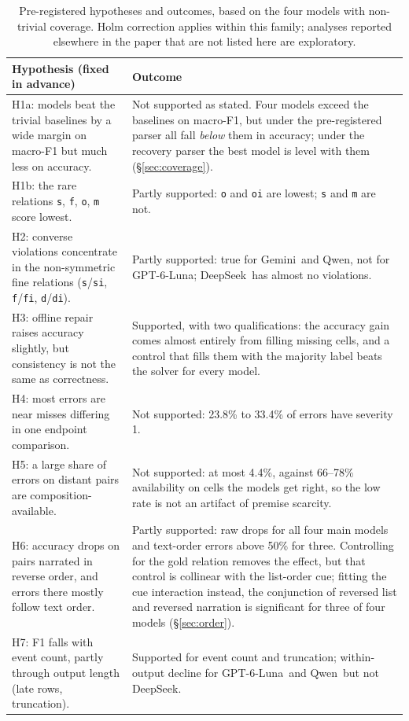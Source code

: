 \documentclass[11pt]{article}
\newcommand{\rel}[1]{\texttt{#1}}
\newcommand{\Ds}{DeepSeek}
\newcommand{\Gp}{GPT-6-Luna}
\newcommand{\Gm}{Gemini}
\newcommand{\Qw}{Qwen}
\begin{document}
\begin{table}[t]
\centering
\small
\begin{tabular}{p{} p{}}
\toprule
Hypothesis (fixed in advance) & Outcome \\
\midrule
H1a: models beat the trivial baselines by a wide margin on macro-F1 but much less on accuracy. & Not supported as stated. Four models exceed the baselines on macro-F1, but under the pre-registered parser all fall \emph{below} them in accuracy; under the recovery parser the best model is level with them (\S\ref{sec:coverage}). \\
H1b: the rare relations \rel{s}, \rel{f}, \rel{o}, \rel{m} score lowest. & Partly supported: \rel{o} and \rel{oi} are lowest; \rel{s} and \rel{m} are not. \\
H2: converse violations concentrate in the non-symmetric fine relations (\rel{s}/\rel{si}, \rel{f}/\rel{fi}, \rel{d}/\rel{di}). & Partly supported: true for \Gm\ and \Qw, not for \Gp; \Ds\ has almost no violations. \\
H3: offline repair raises accuracy slightly, but consistency is not the same as correctness. & Supported, with two qualifications: the accuracy gain comes almost entirely from filling missing cells, and a control that fills them with the majority label beats the solver for every model. \\
H4: most errors are near misses differing in one endpoint comparison. & Not supported: 23.8\% to 33.4\% of errors have severity 1. \\
H5: a large share of errors on distant pairs are composition-available. & Not supported: at most 4.4\%, against 66--78\% availability on cells the models get right, so the low rate is not an artifact of premise scarcity. \\
H6: accuracy drops on pairs narrated in reverse order, and errors there mostly follow text order. & Partly supported: raw drops for all four main models and text-order errors above 50\% for three. Controlling for the gold relation removes the effect, but that control is collinear with the list-order cue; fitting the cue interaction instead, the conjunction of reversed list and reversed narration is significant for three of four models (\S\ref{sec:order}). \\
H7: F1 falls with event count, partly through output length (late rows, truncation). & Supported for event count and truncation; within-output decline for \Gp\ and \Qw\ but not \Ds. \\
\bottomrule
\end{tabular}
\caption{Pre-registered hypotheses and outcomes, based on the four models with non-trivial coverage. Holm correction applies within this family; analyses reported elsewhere in the paper that are not listed here are exploratory.}
\label{tab:hyp}
\end{table}
\end{document}
